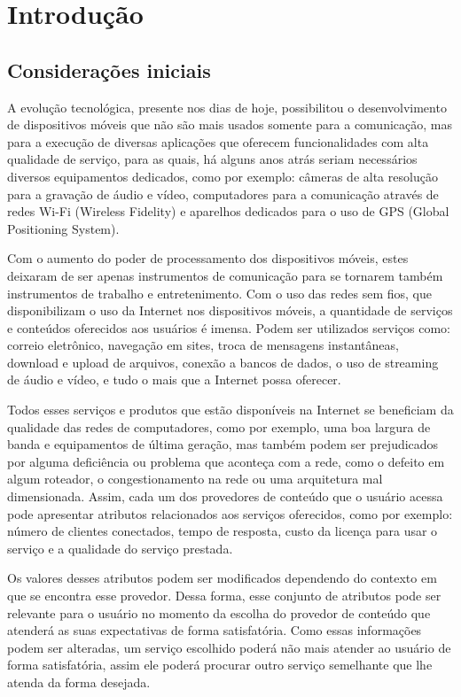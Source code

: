 \chapter{Introdu\c{c}\~ao}
\section{Considerações iniciais}
A evolução tecnológica, presente nos dias de hoje, possibilitou o desenvolvimento de dispositivos móveis que não são mais usados somente para a comunicação, mas para a execução de diversas aplicações que oferecem funcionalidades com alta qualidade de serviço, para as quais, há alguns anos atrás seriam necessários diversos equipamentos dedicados, como por exemplo: câmeras de alta resolução para a gravação de áudio e vídeo, computadores para a comunicação através de redes Wi-Fi (Wireless Fidelity) e aparelhos dedicados para o uso de GPS (Global Positioning System).

Com o aumento do poder de processamento dos dispositivos móveis, estes deixaram de ser apenas instrumentos de comunicação para se tornarem também instrumentos de trabalho e entretenimento.
Com o uso das redes sem fios, que disponibilizam o uso da Internet nos dispositivos móveis, a quantidade de serviços e conteúdos oferecidos aos usuários é imensa. Podem ser utilizados serviços como: correio eletrônico, navegação em sites, troca de mensagens instantâneas, download e upload de arquivos, conexão a bancos de dados, o uso de streaming de áudio e vídeo, e tudo o mais que a Internet possa oferecer.

Todos esses serviços e produtos que estão disponíveis na Internet se beneficiam da qualidade das redes de computadores, como por exemplo, uma boa largura de banda e equipamentos de última geração, mas também podem ser prejudicados por alguma deficiência ou problema que aconteça com a rede, como o defeito em algum roteador, o congestionamento na rede ou uma arquitetura mal dimensionada. Assim, cada um dos provedores de conteúdo que o usuário acessa pode apresentar atributos relacionados aos serviços oferecidos, como por exemplo: número de clientes conectados, tempo de resposta, custo da licença para usar o serviço e a qualidade do serviço prestada.

Os valores desses atributos podem ser modificados dependendo do contexto em que se encontra esse provedor. Dessa forma, esse conjunto de atributos pode ser relevante para o usuário no momento da escolha do provedor de conteúdo que atenderá as suas expectativas de forma satisfatória. Como essas informações podem ser alteradas, um serviço escolhido poderá não mais atender ao usuário de forma satisfatória, assim ele poderá procurar outro serviço semelhante que lhe atenda da forma desejada.

